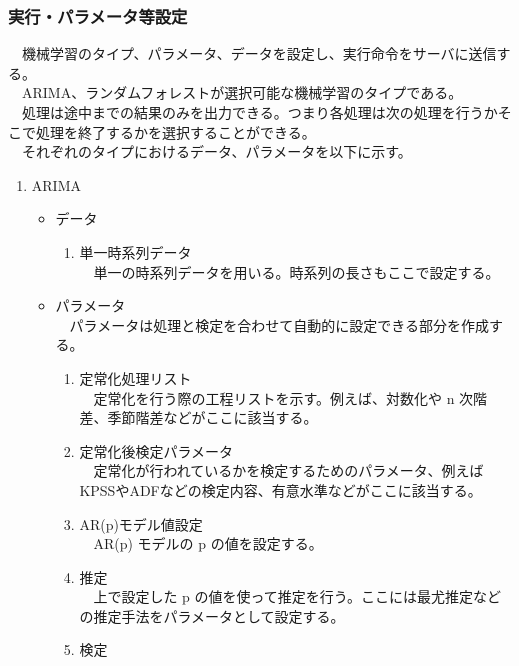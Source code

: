 \documentclass{scrartcl}
\begin{document}
\subsubsection{実行・パラメータ等設定}
\label{sec:org8b19c68}
　機械学習のタイプ、パラメータ、データを設定し、実行命令をサーバに送信する。\\
　ARIMA、ランダムフォレストが選択可能な機械学習のタイプである。\\
　処理は途中までの結果のみを出力できる。つまり各処理は次の処理を行うかそこで処理を終了するかを選択することができる。\\
　それぞれのタイプにおけるデータ、パラメータを以下に示す。\\
\begin{enumerate}
\item ARIMA
\label{sec:org5fd6f48}
\begin{itemize}
\item データ\\
\begin{enumerate}
\item 単一時系列データ\\
　単一の時系列データを用いる。時系列の長さもここで設定する。\\
\end{enumerate}
\item パラメータ\\
　パラメータは処理と検定を合わせて自動的に設定できる部分を作成する。\\
\begin{enumerate}
\item 定常化処理リスト\\
　定常化を行う際の工程リストを示す。例えば、対数化や n 次階差、季節階差などがここに該当する。\\
\item 定常化後検定パラメータ\\
　定常化が行われているかを検定するためのパラメータ、例えば KPSSやADFなどの検定内容、有意水準などがここに該当する。\\
\item AR(p)モデル値設定\\
　AR(p) モデルの p の値を設定する。\\
\item 推定\\
　上で設定した p の値を使って推定を行う。ここには最尤推定などの推定手法をパラメータとして設定する。\\
\item 検定\\

\end{enumerate}
\end{itemize}
\end{enumerate}
\end{document}
